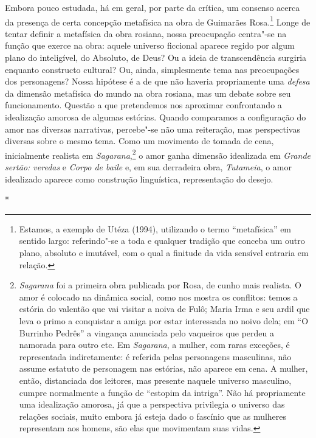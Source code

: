 {Embora pouco estudada, há em geral, por parte da crítica, um consenso
acerca da presença de certa concepção metafísica na obra de Guimarães
Rosa.\footnote{ Estamos, a exemplo de Utéza (1994), utilizando o
termo “metafísica” em sentido largo: referindo"-se a toda e qualquer
tradição que conceba um outro plano, absoluto e imutável, com o qual
a finitude da vida sensível entraria em relação.}  Longe de
tentar definir a metafísica da obra rosiana, nossa preocupação
centra"-se na função que exerce na obra: aquele universo ficcional
aparece regido por algum plano do inteligível, do Absoluto, de Deus?
Ou a ideia de transcendência surgiria enquanto constructo cultural?
Ou, ainda, simplesmente tema nas preocupações dos personagens? Nossa
hipótese é a de que não haveria propriamente uma \emph{defesa} da
dimensão metafísica do mundo na obra rosiana, mas um debate sobre seu
funcionamento. Questão a que pretendemos nos aproximar confrontando a
idealização amorosa de algumas estórias. Quando comparamos a
configuração do amor nas diversas narrativas, percebe"-se não uma
reiteração, mas perspectivas diversas sobre o mesmo tema. Como um
movimento de tomada de cena, inicialmente realista em
\emph{Sagarana},\footnote{ \emph{Sagarana} foi a primeira obra
publicada por Rosa, de cunho mais realista. O amor é colocado na
dinâmica social, como nos mostra os conflitos: temos a estória do
valentão que vai visitar a noiva de Fulô; Maria Irma e seu ardil que
leva o primo a conquistar a amiga por estar interessada no noivo
dela; em “O Burrinho Pedrês” a vingança anunciada pelo vaqueiros que
perdeu a namorada para outro etc. Em \emph{Sagarana}, a mulher,
com raras exceções, é representada indiretamente: é referida pelas
personagens masculinas, não assume estatuto de personagem nas
estórias, não aparece em cena. A mulher, então, distanciada dos
leitores, mas presente naquele universo masculino, cumpre normalmente
a função de “estopim da intriga”. Não há propriamente uma idealização
amorosa, já que a perspectiva privilegia o universo das relações
sociais, muito embora já esteja dado o fascínio que as mulheres
representam aos homens, são elas que movimentam suas vidas. }
 o amor ganha dimensão idealizada em \emph{Grande sertão: veredas}
e \emph{Corpo de baile} e, em sua derradeira obra,
\emph{Tutameia}, o amor idealizado aparece como construção
linguística, representação do desejo.

\begin{center}
*\quad*\quad*
\end{center}

}
